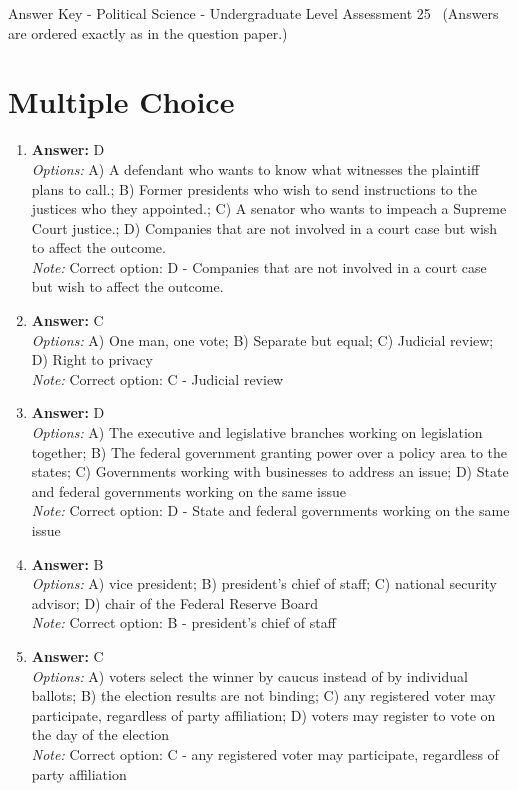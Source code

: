 \documentclass[12pt]{article}
\begin{document}
\begin{center}
Answer Key - Political Science - Undergraduate Level Assessment 25 \
\small (Answers are ordered exactly as in the question paper.)
\end{center}

\section*{Multiple Choice}
\begin{enumerate}[label=\arabic*.]
\item \textbf{Answer:} D
\\ \textit{Options:} A) A defendant who wants to know what witnesses the plaintiff plans to call.; B) Former presidents who wish to send instructions to the justices who they appointed.; C) A senator who wants to impeach a Supreme Court justice.; D) Companies that are not involved in a court case but wish to affect the outcome.
\\ \textit{Note:} Correct option: D - Companies that are not involved in a court case but wish to affect the outcome.
\item \textbf{Answer:} C
\\ \textit{Options:} A) One man, one vote; B) Separate but equal; C) Judicial review; D) Right to privacy
\\ \textit{Note:} Correct option: C - Judicial review
\item \textbf{Answer:} D
\\ \textit{Options:} A) The executive and legislative branches working on legislation together; B) The federal government granting power over a policy area to the states; C) Governments working with businesses to address an issue; D) State and federal governments working on the same issue
\\ \textit{Note:} Correct option: D - State and federal governments working on the same issue
\item \textbf{Answer:} B
\\ \textit{Options:} A) vice president; B) president's chief of staff; C) national security advisor; D) chair of the Federal Reserve Board
\\ \textit{Note:} Correct option: B - president's chief of staff
\item \textbf{Answer:} C
\\ \textit{Options:} A) voters select the winner by caucus instead of by individual ballots; B) the election results are not binding; C) any registered voter may participate, regardless of party affiliation; D) voters may register to vote on the day of the election
\\ \textit{Note:} Correct option: C - any registered voter may participate, regardless of party affiliation
\end{enumerate}
\end{document}
